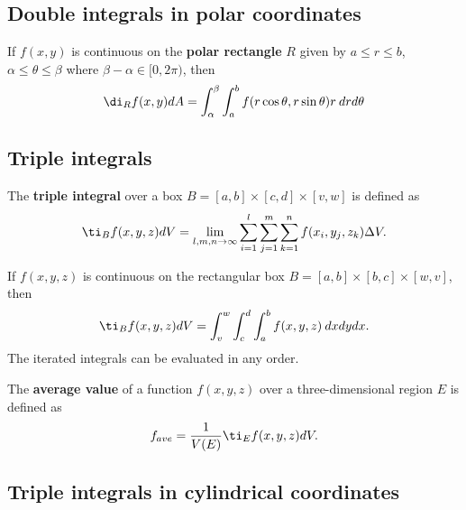 \documentclass{article}
\begin{document}
\subsection{Double integrals in polar coordinates}


\begin{theorem}
	If $f(x,y)$ is continuous on the \textbf{polar rectangle} $R$
	given by $a\leq r \leq b$, $\alpha \leq \theta\leq \beta$ where
	$\beta-\alpha \in [0,2\pi)$, then
	\begin{align*}
		\di_R f(x,y)dA = \int_\alpha^\beta \int_a^b
		f(r\cos\theta, r\sin\theta)r\:drd\theta
	\end{align*}
\end{theorem}


\subsection{Triple integrals}


\begin{definition}
	The \textbf{triple integral} over a box $B=[a,b]\times[c,d]\times[v,w]$
	is defined as
	\begin{align*}
		\ti_B f(x,y,z)dV = \lim_{l,m,n\to\infty}\sum_{i=1}^l \sum_{j=1}^m \sum_{k=1}^n
		f(x_i,y_j,z_k)\Delta V.
	\end{align*}
\end{definition}
\begin{theorem}
	If $f(x,y,z)$ is continuous on the rectangular box $B=[a,b]\times[b,c]\times[w,v]$,
	then
	\begin{align*}
		\ti_B f(x,y,z) dV = \int_v^w\int_c^d \int_a^b f(x,y,z)\:dxdydx.
	\end{align*}
	The iterated integrals can be evaluated in any order.
\end{theorem}
\begin{definition}
	The \textbf{average value} of a function $f(x,y,z)$ over a three-dimensional region $E$
	is defined as
	\begin{align*}
		f_{ave} = \frac{1}{V(E)}\ti_E f(x,y,z)dV.
	\end{align*}
\end{definition}


\subsection{Triple integrals in cylindrical coordinates}
\end{document}
